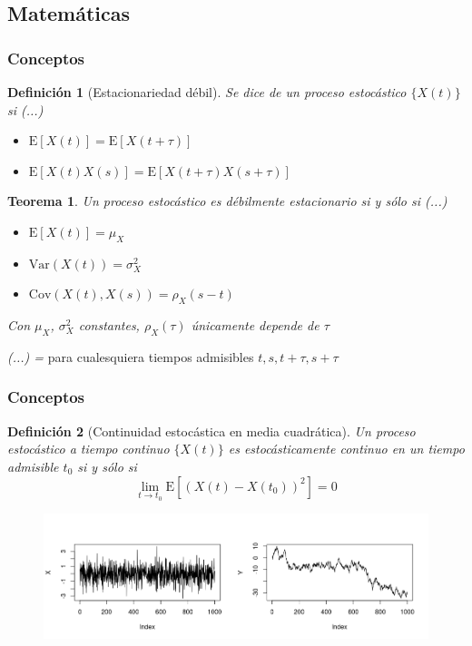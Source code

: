 \documentclass{beamer}
\newtheorem{defn}{Definici\'on}
\newtheorem{thrm}{Teorema}
\newcommand{\E}[1]{\mathrm{E}\left[ #1 \right]}
\newcommand{\Var}[1]{\mathrm{Var}\left( #1 \right)}
\newcommand{\Cov}[1]{\mathrm{Cov}\left( #1 \right)}
\begin{document}

\subsection{Matem\'aticas}

\begin{frame}\frametitle{Conceptos}
{\small
\begin{defn}[Estacionariedad d\'ebil]
Se dice de un proceso estoc\'astico $\{ X(t) \}$ si (...)
\begin{itemize}
\item $\E{X(t)} = \E{X(t+\tau)}$
\item $\E{X(t)X(s)} = \E{X(t+\tau)X(s+\tau)}$
\end{itemize}
\end{defn}

\begin{thrm}
Un proceso estoc\'astico es d\'ebilmente estacionario si y s\'olo si (...)
\begin{itemize}
\item $\E{X(t)} = \mu_X$
\item $\Var{X(t)} = \sigma^{2}_X$
\item $\Cov{X(t),X(s)} = \rho_X (s-t)$
\end{itemize}
Con $\mu_X$, $\sigma^{2}_X$ constantes, $\rho_X(\tau)$ \'unicamente depende de $\tau$
\end{thrm}

\emph{(...) = } para cualesquiera tiempos admisibles $t, s, t+\tau, s+\tau$
}
\end{frame}


\begin{frame}\frametitle{Conceptos}
\begin{defn}[Continuidad estoc\'astica en media cuadr\'atica]
Un proceso estoc\'astico a tiempo continuo $\{ X(t) \}$ es estoc\'asticamente continuo
en un tiempo admisible $t_0$ si y s\'olo si
\begin{equation*}
\lim_{t \rightarrow t_0} \E{\left( X\left(t\right) - X\left(t_0\right) \right)^{2}} = 0
\end{equation*}
\end{defn}

\begin{figure}
\includegraphics[width=.92\linewidth]{ehemplitos_ruido.png}
\end{figure}
\end{frame}
\end{document}
